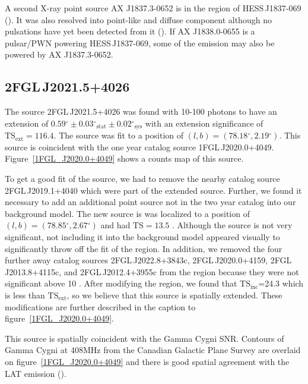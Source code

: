\documentclass[12pt,preprint]{aastex}
\newcommand{\gev}{\text{GeV}\xspace}
\newcommand{\tev}{\text{TeV}\xspace}
\newcommand{\tsext}{{\ensuremath{\text{TS}_{\text{ext}}}}\xspace}
\newcommand{\tsinc}{\ensuremath{\text{TS}_{\text{inc}}}\xspace}
\newcommand{\ts}{\text{TS}\xspace}
\newcommand{\sys}{\text{sys}\xspace}
\newcommand{\stat}{\text{stat}\xspace}
\renewcommand{\deg}{\ensuremath{^\circ}\xspace}
\begin{document}
A second X-ray point source AX J1837.3-0652 is in the region of HESS\,J1837-069
(\cite{hard_x-ray_asca,swift_follow_up,pulsations_HESS_J1837-069,suzaku_HESS_J1837-069}).
It was also resolved into point-like and diffuse component
although no pulsations have yet been detected from it
(\cite{pulsations_HESS_J1837-069}).  If AX J1838.0-0655 is a pulsar/PWN
powering HESS\,J1837-069, some of the \tev emission
may also be powered by AX J1837.3-0652.


\subsection{2FGL\,J2021.5+4026}
\label{section_2FGL J2021.5+4026}



The source 2FGL\,J2021.5+4026 was found with 10-100 \gev
photons to have an extension of $0.59\deg\pm0.03\deg_\stat\pm0.02\deg_\sys$
with an extension significance of $\tsext=116.4$.  The source was
fit to a position of $(l,b)=(78.18\deg,2.19\deg)$.  This source
is coincident with the one year catalog source 1FGL\,J2020.0+4049.
Figure~\ref{1FGL_J2020.0+4049} shows a counts map of this source.

To get a good fit of the source, we had to remove the nearby catalog
source 2FGL\,J2019.1+4040 which were part of the extended source.
Further, we found it necessary to add an additional point source not in
the two year catalog into our background model.  The new source is was
localized to a position of $(l,b)=(78.85\deg,2.67\deg)$ and had $\ts=13.5$ .
Although the source is not very significant, not including it into the
background model appeared visually to significantly throw off the fit
of the region.  In addition, we removed the four further away catalog
sources 2FGL\,J2022.8+3843c, 2FGL\,J2020.0+4159, 2FGL\,J2013.8+4115c,
and 2FGL\,J2012.4+3955c from the region because they were not significant
above 10 \gev.  After modifying the region, we found that \tsinc=24.3
which is less than \tsext, so we believe that this source is spatially
extended.  These modifications are further described in the caption to
figure~\ref{1FGL_J2020.0+4049}.

This source is spatially coincident with the Gamma Cygni SNR.  Contours of
Gamma Cygni at 408MHz from the Canadian Galactic Plane Survey are overlaid
on figure~\ref{1FGL_J2020.0+4049} and there is good spatial agreement
with the LAT emission (\cite{canadian_galactic_plane_survey}).
\end{document}
